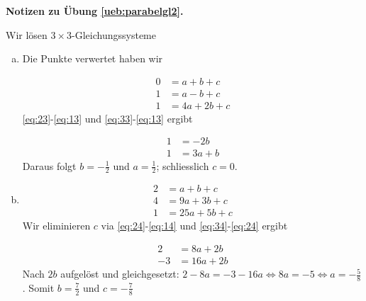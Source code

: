 \documentclass[%
11pt,%
twoside,%
titlepage,%
swissgerman,%
headsepline%
]{scrartcl}
\newcommand{\faReturnGray}{\textcolor{gray}{\faMailReply}} %
\theoremstyle{definition}
\theoremstyle{plain}
\newcommand{\concatueb}[1]{ueb:#1}%
\newcommand{\concatlsg}[1]{lsg:#1}%
\newenvironment{lsg}[1]{%
    \par\noindent\textbf{Notizen zu Übung \ref{\concatueb{#1}}.}%
    \label{\concatlsg{#1}} %
    \hfill\hyperref[\concatueb{#1}]{\faReturnGray}\par %
}{%
    \par%
}
\begin{document}
\begin{lsg}{parabelgl2}
Wir lösen $3\times3$-Gleichungssysteme
    \begin{enumerate}[a)]
        \item Die Punkte verwertet haben wir

        \begin{align}
            0 &= a+b+c\label{eq:13}\\
            1 &= a-b+c\label{eq:23}\\
            1 &= 4a+2b+c\label{eq:33}
        \end{align}
        \eqref{eq:23}-\eqref{eq:13} und \eqref{eq:33}-\eqref{eq:13} ergibt

        \begin{align*}
            1 &= -2b\\
            1 &= 3a+b
        \end{align*}
        Daraus folgt $b=-\frac{1}{2}$ und $a=\frac{1}{2}$; schliesslich $c=0$.

        \item \begin{align}
            2 &= a+b+c\label{eq:14}\\
            4 &= 9a+3b+c\label{eq:24}\\
            1 &= 25a+5b+c\label{eq:34}
        \end{align}
        Wir eliminieren $c$ via \eqref{eq:24}-\eqref{eq:14} und \eqref{eq:34}-\eqref{eq:24} ergibt

        \begin{align*}
            2 &= 8a+2b\\
            -3 &= 16a+2b
        \end{align*}
        Nach $2b$ aufgelöst und gleichgesetzt: $2-8a=-3-16a\Leftrightarrow 8a=-5\Leftrightarrow a=-\frac{5}{8}$. Somit $b=\frac{7}{2}$ und $c=-\frac{7}{8}$
    \end{enumerate}
\end{lsg}
\end{document}

